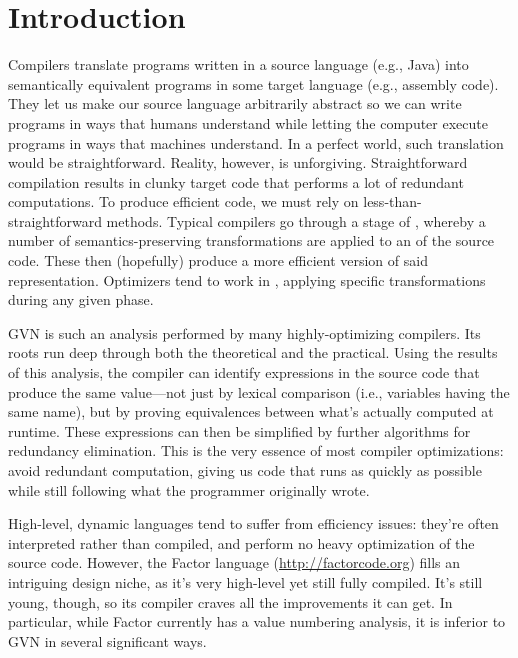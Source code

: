 \section{Introduction}\label{sec:intro}


Compilers translate programs written in a source language (e.g., Java) into
semantically equivalent programs in some target language (e.g., assembly code).
They let us make our source language arbitrarily abstract so we can write
programs in ways that humans understand while letting the computer execute
programs in ways that machines understand.  In a perfect world, such
translation would be straightforward.  Reality, however, is unforgiving.
Straightforward compilation results in clunky target code that performs a lot
of redundant computations.  To produce efficient code, we must rely on
less-than-straightforward methods.  Typical compilers go through a stage of
, whereby a number of semantics-preserving transformations
are applied to an  of the source code.  These
then (hopefully) produce a more efficient version of said representation.
Optimizers tend to work in , applying specific transformations
during any given phase.

\Gls{GVN} is such an analysis performed by many highly-optimizing compilers.
Its roots run deep through both the theoretical and the practical.  Using the
results of this analysis, the compiler can identify expressions in the source
code that produce the same value---not just by lexical comparison (i.e.,
variables having the same name), but by proving equivalences between what's
actually computed at runtime.  These expressions can then be simplified by
further algorithms for redundancy elimination.  This is the very essence of
most compiler optimizations: avoid redundant computation, giving us code that
runs as quickly as possible while still following what the programmer
originally wrote.

High-level, dynamic languages tend to suffer from efficiency issues: they're
often interpreted rather than compiled, and perform no heavy optimization of
the source code.  However, the Factor language (\url{http://factorcode.org})
fills an intriguing design niche, as it's very high-level yet still fully
compiled.  It's still young, though, so its compiler craves all the
improvements it can get.  In particular, while Factor currently has a
 value numbering analysis, it is inferior to \gls{GVN} in several
significant ways.

